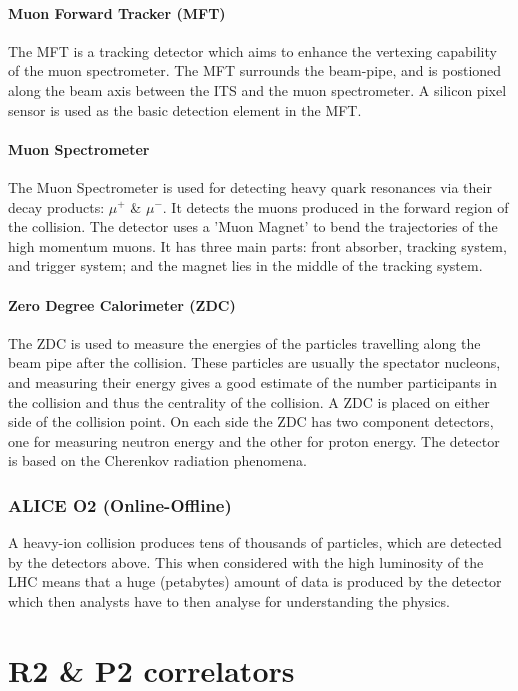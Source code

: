 \documentclass[12pt,a4paper,twoside]{report}
\begin{document}
\subsubsection{Muon Forward Tracker (MFT)}
The MFT is a tracking detector which aims to enhance the vertexing capability of the muon spectrometer. The MFT surrounds the beam-pipe, and is postioned along the beam axis between the ITS and the muon spectrometer. A silicon pixel sensor is used as the basic detection element in the MFT.
\subsubsection{Muon Spectrometer}
The Muon Spectrometer is used for detecting heavy quark resonances via their decay products: $\mu^{+}$ \& $\mu^{-}$. It detects the muons produced in the forward region of the collision. The detector uses a 'Muon Magnet' to bend the trajectories of the high momentum muons. It has three main parts: front absorber, tracking system, and trigger system; and the magnet lies in the middle of the tracking system.
\subsubsection{Zero Degree Calorimeter (ZDC)}
The ZDC is used to measure the energies of the particles travelling along the beam pipe after the collision. These particles are usually the spectator nucleons, and measuring their energy gives a good estimate of the number participants in the collision and thus the centrality of the collision. A ZDC is placed on either side of the collision point. On each side the ZDC has two component detectors, one for measuring neutron energy and the other for proton energy. The detector is based on the Cherenkov radiation phenomena.
\subsection{ALICE O2 (Online-Offline)}
A heavy-ion collision produces tens of thousands of particles, which are detected by the detectors above. This when considered with the high luminosity of the LHC means that a huge (petabytes) amount of data is produced by the detector which then analysts have to then analyse for understanding the physics.\\<Mention how data is collected reconstructed and stored>

\chapter{R2 \& P2 correlators}\label{Ch:R2P2}
\end{document}
